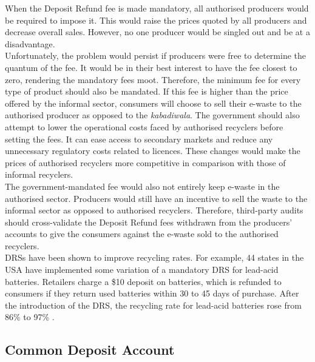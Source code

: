 \documentclass[a4paper, 12pt]{article}
\begin{document}
                    When the Deposit Refund fee is made mandatory, all authorised producers would be required to impose it. This would raise the prices quoted by all producers and decrease overall sales. However, no one producer would be singled out and be at a disadvantage.\\
                      
                      Unfortunately, the problem would persist if producers were free to determine the quantum of the fee. It would be in their best interest to have the fee closest to zero, rendering the mandatory fees moot. Therefore, the minimum fee for every type of product should also be mandated. If this fee is higher than the price offered by the informal sector, consumers will choose to sell their e-waste to the authorised producer as opposed to the \textit{kabadiwala}. The government should also attempt to lower the operational costs faced by authorised recyclers before setting the fees. It can ease access to secondary markets and reduce any unnecessary regulatory costs related to licences. These changes would make the prices of authorised recyclers more competitive in comparison with those of informal recyclers.\\
                    
                    The government-mandated fee would also not entirely keep e-waste in the authorised sector. Producers would still have an incentive to sell the waste to the informal sector as opposed to authorised recyclers. Therefore, third-party audits should cross-validate the Deposit Refund fees withdrawn from the producers’ accounts to give the consumers against the e-waste sold to the authorised recyclers.\\ 
                    
                    DRSs have been shown to improve recycling rates. For example, 44 states in the USA have implemented some variation of a mandatory DRS for lead-acid batteries. Retailers charge a \$10 deposit on batteries, which is refunded to consumers if they return used batteries within 30 to 45 days of purchase. After the introduction of the DRS, the recycling rate for lead-acid batteries rose from 86\% to 97\% \parencite{wallspaper}.
                    
                    \subsection{Common Deposit Account}
                    
\end{document}
